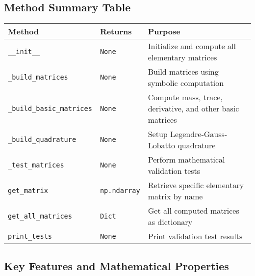 \subsection{Method Summary Table}
\label{subsec:elementary_matrices_method_summary}

\begin{longtable}{|p{4.5cm}|p{2cm}|p{7cm}|}
\hline
\textbf{Method} & \textbf{Returns} & \textbf{Purpose} \\
\hline
\endhead

\texttt{\_\_init\_\_} & \texttt{None} & Initialize and compute all elementary matrices \\
\hline

\texttt{\_build\_matrices} & \texttt{None} & Build matrices using symbolic computation \\
\hline

\texttt{\_build\_basic\_matrices} & \texttt{None} & Compute mass, trace, derivative, and other basic matrices \\
\hline

\texttt{\_build\_quadrature} & \texttt{None} & Setup Legendre-Gauss-Lobatto quadrature \\
\hline

\texttt{\_test\_matrices} & \texttt{None} & Perform mathematical validation tests \\
\hline

\texttt{get\_matrix} & \texttt{np.ndarray} & Retrieve specific elementary matrix by name \\
\hline

\texttt{get\_all\_matrices} & \texttt{Dict} & Get all computed matrices as dictionary \\
\hline

\texttt{print\_tests} & \texttt{None} & Print validation test results \\
\hline

\end{longtable}

\subsection{Key Features and Mathematical Properties}

